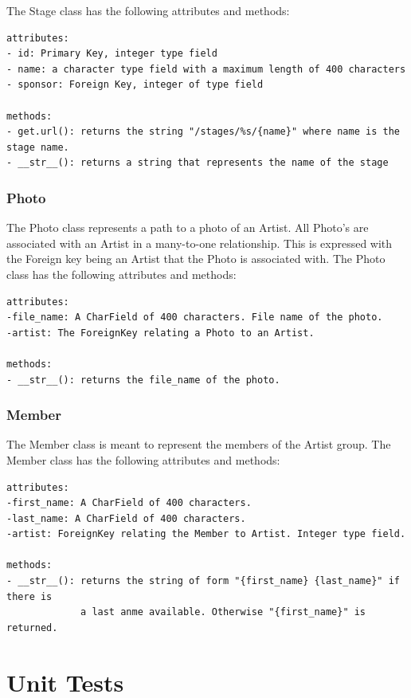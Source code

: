 \documentclass[12pt,english]{scrartcl}
\begin{document}
The Stage class has the following attributes and methods:
\begin{verbatim}
attributes:
- id: Primary Key, integer type field
- name: a character type field with a maximum length of 400 characters
- sponsor: Foreign Key, integer of type field

methods:
- get.url(): returns the string "/stages/%s/{name}" where name is the stage name.
- __str__(): returns a string that represents the name of the stage
\end{verbatim}

\subsubsection{Photo}
The Photo class represents a path to a photo of an Artist. 
All Photo's are associated with an Artist in a many-to-one relationship.
This is expressed with the Foreign key being an Artist that the Photo is associated with. 
The Photo class has the following attributes and methods:
\begin{verbatim}
attributes:
-file_name: A CharField of 400 characters. File name of the photo. 
-artist: The ForeignKey relating a Photo to an Artist.

methods:
- __str__(): returns the file_name of the photo.
\end{verbatim}

\subsubsection{Member}
The Member class is meant to represent the members of the Artist group. The Member class has the following attributes and methods:
\begin{verbatim}
attributes:
-first_name: A CharField of 400 characters. 
-last_name: A CharField of 400 characters.
-artist: ForeignKey relating the Member to Artist. Integer type field.

methods:
- __str__(): returns the string of form "{first_name} {last_name}" if there is
             a last anme available. Otherwise "{first_name}" is returned.
\end{verbatim}

\section{Unit Tests}
\end{document}
